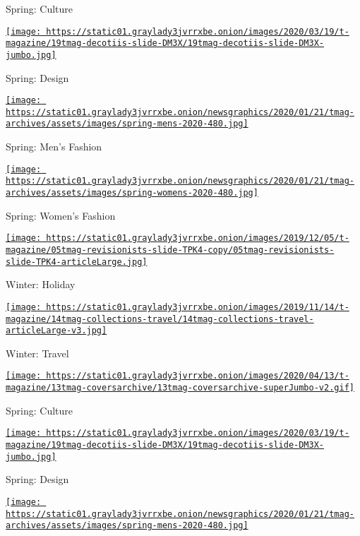 Spring: Culture

\href{https://www.nytimes3xbfgragh.onion/issue/t-magazine/2020/03/06/ts-march-22-design-issue}{\texttt{[image: https://static01.graylady3jvrrxbe.onion/images/2020/03/19/t-magazine/19tmag-decotiis-slide-DM3X/19tmag-decotiis-slide-DM3X-jumbo.jpg]}}

Spring: Design

\href{https://www.nytimes3xbfgragh.onion/issue/t-magazine/2020/02/21/ts-march-8-mens-fashion-issue}{\texttt{[image: https://static01.graylady3jvrrxbe.onion/newsgraphics/2020/01/21/tmag-archives/assets/images/spring-mens-2020-480.jpg]}}

Spring: Men's Fashion

\href{https://www.nytimes3xbfgragh.onion/issue/t-magazine/2020/02/06/ts-feb-23-womens-fashion-issue}{\texttt{[image: https://static01.graylady3jvrrxbe.onion/newsgraphics/2020/01/21/tmag-archives/assets/images/spring-womens-2020-480.jpg]}}

Spring: Women's Fashion

\href{https://www.nytimes3xbfgragh.onion/issue/t-magazine/2019/11/21/ts-dec-8-holiday-issue}{\texttt{[image: https://static01.graylady3jvrrxbe.onion/images/2019/12/05/t-magazine/05tmag-revisionists-slide-TPK4-copy/05tmag-revisionists-slide-TPK4-articleLarge.jpg]}}

Winter: Holiday

\href{https://www.nytimes3xbfgragh.onion/issue/t-magazine/2019/11/04/ts-nov-17-travel-issue}{\texttt{[image: https://static01.graylady3jvrrxbe.onion/images/2019/11/14/t-magazine/14tmag-collections-travel/14tmag-collections-travel-articleLarge-v3.jpg]}}

Winter: Travel

\href{https://www.nytimes3xbfgragh.onion/issue/t-magazine/2020/04/12/ts-april-19-culture-issue}{\texttt{[image: https://static01.graylady3jvrrxbe.onion/images/2020/04/13/t-magazine/13tmag-coversarchive/13tmag-coversarchive-superJumbo-v2.gif]}}

Spring: Culture

\href{https://www.nytimes3xbfgragh.onion/issue/t-magazine/2020/03/06/ts-march-22-design-issue}{\texttt{[image: https://static01.graylady3jvrrxbe.onion/images/2020/03/19/t-magazine/19tmag-decotiis-slide-DM3X/19tmag-decotiis-slide-DM3X-jumbo.jpg]}}

Spring: Design

\href{https://www.nytimes3xbfgragh.onion/issue/t-magazine/2020/02/21/ts-march-8-mens-fashion-issue}{\texttt{[image: https://static01.graylady3jvrrxbe.onion/newsgraphics/2020/01/21/tmag-archives/assets/images/spring-mens-2020-480.jpg]}}

